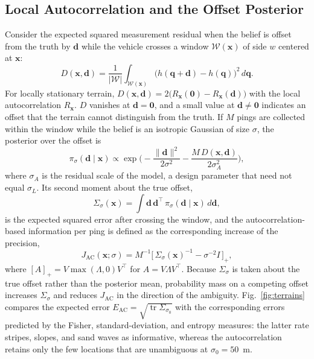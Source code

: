 \documentclass[letterpaper, 10 pt, journal, twoside]{IEEEtran}
\DeclareMathOperator{\tr}{tr}
\newcommand{\bx}{\mathbf{x}}
\newcommand{\bd}{\mathbf{d}}
\newcommand{\bq}{\mathbf{q}}
\newcommand{\JA}{J_{\mathrm{AC}}}
\begin{document}
\subsection{Local Autocorrelation and the Offset Posterior}
Consider the expected squared measurement residual when the belief is offset from the truth by $\bd$ while the vehicle crosses a window $\mathcal{W}(\bx)$ of side $w$ centered at $\bx$:
\begin{equation}
  D(\bx, \bd) = \frac{1}{|\mathcal{W}|}\int_{\mathcal{W}(\bx)} \big( h(\bq + \bd) - h(\bq) \big)^2 \, d\bq.
  \label{eq:D}
\end{equation}
For locally stationary terrain, $D(\bx,\bd) = 2\big(R_{\bx}(\mathbf{0}) - R_{\bx}(\bd)\big)$ with the local autocorrelation $R_{\bx}$. $D$ vanishes at $\bd = \mathbf{0}$, and a small value at $\bd \neq \mathbf{0}$ indicates an offset that the terrain cannot distinguish from the truth. If $M$ pings are collected within the window while the belief is an isotropic Gaussian of size $\sigma$, the posterior over the offset is
\begin{equation}
  \pi_\sigma(\bd \mid \bx) \propto \exp\!\Big( -\frac{\|\bd\|^2}{2\sigma^2} - \frac{M\,D(\bx,\bd)}{2\sigma_A^2} \Big),
  \label{eq:posterior}
\end{equation}
where $\sigma_A$ is the residual scale of the model, a design parameter that need not equal $\sigma_L$. Its second moment about the true offset,
\begin{equation}
  \Sigma_\sigma(\bx) = \textstyle\int \bd\,\bd^\top\, \pi_\sigma(\bd \mid \bx)\, d\bd,
  \label{eq:second_moment}
\end{equation}
is the expected squared error after crossing the window, and the autocorrelation-based information per ping is defined as the corresponding increase of the precision,
\begin{equation}
  \JA(\bx; \sigma) = M^{-1}\big[\, \Sigma_\sigma(\bx)^{-1} - \sigma^{-2} I \,\big]_+,
  \label{eq:Jac}
\end{equation}
where $[A]_+ = V\max(\Lambda, 0)V^\top$ for $A = V\Lambda V^\top$. Because $\Sigma_\sigma$ is taken about the true offset rather than the posterior mean, probability mass on a competing offset increases $\Sigma_\sigma$ and reduces $\JA$ in the direction of the ambiguity. Fig.~\ref{fig:terrains} compares the expected error $E_{\mathrm{AC}} = \sqrt{\tr\Sigma_{\sigma_0}}$ with the corresponding errors predicted by the Fisher, standard-deviation, and entropy measures: the latter rate stripes, slopes, and sand waves as informative, whereas the autocorrelation retains only the few locations that are unambiguous at $\sigma_0 = 50$~m.
\end{document}
